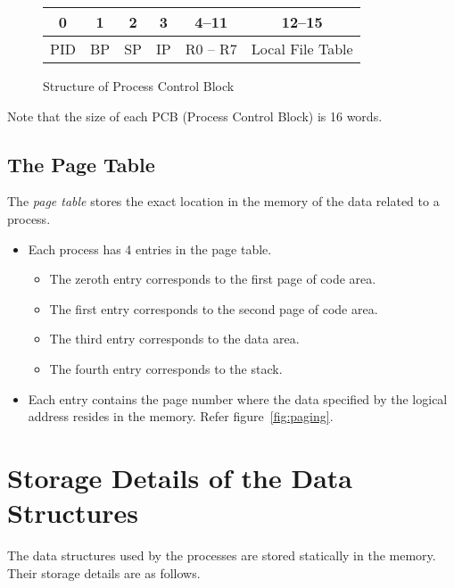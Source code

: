 \newcommand{\pcb}[1]{
	\begin{figure}[htp!]
		\centering
		\begin{tabular}{|c|c|c|c|c|c|}
			\hline
			0 & 1 & 2 & 3 & 4--11 & 12--15 \\
			\hline
			PID & BP & SP & IP & R0 -- R7 & Local File Table \\
			\hline
		\end{tabular}
		\caption{Structure of Process Control Block}
		\label{#1}
	\end{figure}
	}

\pcb{fig:PCB}

Note that the size of each PCB (Process Control Block) is 16 words. 

\subsection{The Page Table}
\label{lbl:pgtbl}
The \emph{page table} stores the exact location in the memory of the data related to a process.
\begin{itemize}
	\item Each process has 4 entries in the page table.
	\begin{itemize}
		\item The zeroth entry corresponds to the first page of code area.
		\item The first entry corresponds to the second page of code area.
		\item The third entry corresponds to the data area.
		\item The fourth entry corresponds to the stack.
	\end{itemize}
	\item Each entry contains the page number where the data specified by the logical address resides in the memory. Refer figure~\ref{fig:paging}.
\end{itemize}

\section{Storage Details of the Data Structures}
	The data structures used by the processes are stored statically in the memory. Their storage details are as follows.\\

